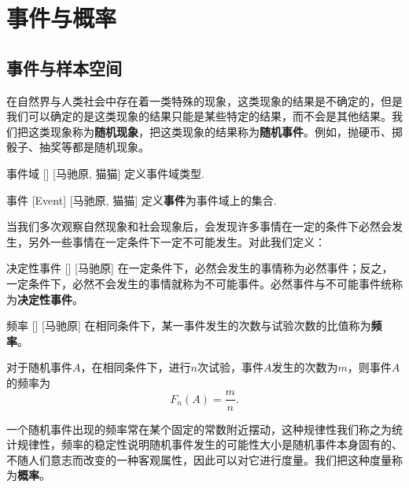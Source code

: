 \documentclass[UTF8]{ctexart}
\begin{document}
\tableofcontents
\newpage

\section{事件与概率}

    \subsection{事件与样本空间}

        在自然界与人类社会中存在着一类特殊的现象，这类现象的结果是不确定的，但是我们可以确定的是这类现象的结果只能是某些特定的结果，而不会是其他结果。我们把这类现象称为\textbf{随机现象}，把这类现象的结果称为\textbf{随机事件}。例如，抛硬币、掷骰子、抽奖等都是随机现象。

        \begin{dfn}
            []
            {事件域}
            []
            [马驰原, 猫猫]
            定义事件域类型. 
        \end{dfn}

        \begin{dfn}
            [Event]
            {事件}
            [Event]
            [马驰原, 猫猫]
            定义\textbf{事件}为事件域上的集合. 
        \end{dfn}

        当我们多次观察自然现象和社会现象后，会发现许多事情在一定的条件下必然会发生，另外一些事情在一定条件下一定不可能发生。对此我们定义：

        \begin{dfn}
            []
            {决定性事件}
            []
            [马驰原]
            在一定条件下，必然会发生的事情称为必然事件；反之，一定条件下，必然不会发生的事情就称为不可能事件。必然事件与不可能事件统称为\textbf{决定性事件}。
        \end{dfn}

        \begin{dfn}
            []
            {频率}
            []
            [马驰原]
            在相同条件下，某一事件发生的次数与试验次数的比值称为\textbf{频率}。

            对于随机事件$A$，在相同条件下，进行$n$次试验，事件$A$发生的次数为$m$，则事件$A$的频率为\[F_n(A)=\frac{m}{n}.\]
        \end{dfn}

        一个随机事件出现的频率常在某个固定的常数附近摆动，这种规律性我们称之为统计规律性，频率的稳定性说明随机事件发生的可能性大小是随机事件本身固有的、不随人们意志而改变的一种客观属性，因此可以对它进行度量。我们把这种度量称为\textbf{概率}。
\end{document}
